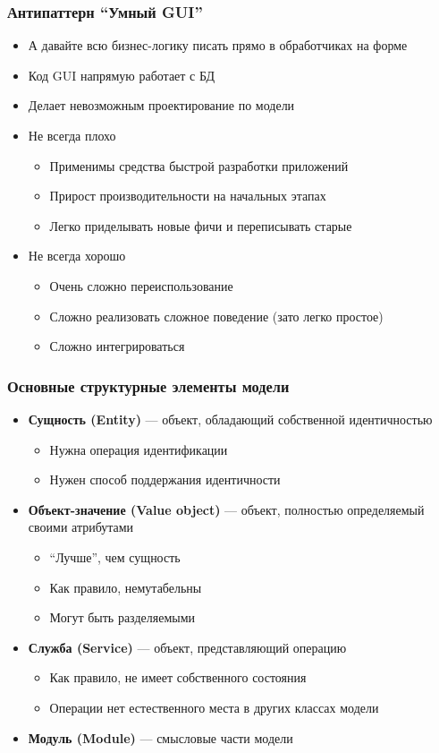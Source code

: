 \documentclass[xetex,mathserif,serif]{beamer}
\begin{document}
	\begin{frame}
		\frametitle{Антипаттерн ``Умный GUI''}
		\begin{itemize}
			\item А давайте всю бизнес-логику писать прямо в обработчиках на форме
			\item Код GUI напрямую работает с БД
			\item Делает невозможным проектирование по модели
			\item Не всегда плохо
			\begin{itemize}
				\item Применимы средства быстрой разработки приложений
				\item Прирост производительности на начальных этапах
				\item Легко приделывать новые фичи и переписывать старые
			\end{itemize}
			\item Не всегда хорошо
			\begin{itemize}
				\item Очень сложно переиспользование
				\item Сложно реализовать сложное поведение (зато легко простое)
				\item Сложно интегрироваться
			\end{itemize}
		\end{itemize}
	\end{frame}

	\begin{frame}
		\frametitle{Основные структурные элементы модели}
		\begin{itemize}
			\item \textbf{Сущность (Entity)} --- объект, обладающий собственной идентичностью
			\begin{itemize}
				\item Нужна операция идентификации
				\item Нужен способ поддержания идентичности
			\end{itemize}
			\item \textbf{Объект-значение (Value object)} --- объект, полностью определяемый своими атрибутами
			\begin{itemize}
				\item ``Лучше'', чем сущность
				\item Как правило, немутабельны
				\item Могут быть разделяемыми
			\end{itemize}
			\item \textbf{Служба (Service)} --- объект, представляющий операцию
			\begin{itemize}
				\item Как правило, не имеет собственного состояния
				\item Операции нет естественного места в других классах модели
			\end{itemize}
			\item \textbf{Модуль (Module)} --- смысловые части модели
		\end{itemize}
	\end{frame}
\end{document}
